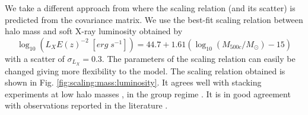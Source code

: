\documentclass[twocolumn,iop]{openjournal}
\begin{document}
We take a different approach from \citet{ComparatEckertFinoguenov_2020OJAp....3E..13C} where the scaling relation (and its scatter) is predicted from the covariance matrix. 
We use the best-fit scaling relation between halo mass and soft X-ray luminosity obtained by \citet[][sample 10.5]{ComparatMerloniPonti_2025arXiv250319796C}
\begin{equation}
\log_{10}(L_X E(z)^{-2}\; [erg\; s^{-1}]) = 44.7 + 1.61 (\log_{10}(M_{500c}/M_\odot)-15)    
\end{equation}
with a scatter of $\sigma_{L_X}=$0.3. 
The parameters of the scaling relation can easily be changed giving more flexibility to the model. 
The scaling relation obtained is shown in Fig. \ref{fig:scaling:mass:luminosity}. 
It agrees well with stacking experiments at low halo masses \citep{ZhangComparatPonti_2024A&A...690A.268Z}, in the group regime \citep{PopessoMariniDolag_2024arXiv241117120P}. 
It is in good agreement with observations reported in the literature \citep{LovisariReiprichSchellenberger_2015A&A...573A.118L, LovisariSchellenbergerSereno_2020ApJ...892..102L, MantzAllenMorris_2016MNRAS.456.4020M,AdamiGilesKoulouridis_2018A&A...620A...5A,SchellenbergerReiprich_2017MNRAS.469.3738S, BulbulChiuMohr_2019ApJ...871...50B, LiuBulbulGhirardini_2022A&A...661A...2L,BulbulLiuKluge_2024A&A...685A.106B}.
\end{document}

